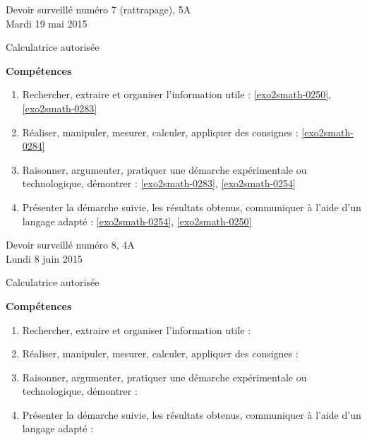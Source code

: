 \documentclass[a4paper,10pt]{article}
\begin{document}
\begin{feuilleDS}{Devoir surveillé numéro 7 (rattrapage), 5A\\ \small Mardi 19 mai 2015}
    \begin{center}
        Calculatrice autorisée
    \end{center}
\vspace{1cm}
{\bf Compétences}
\small
\begin{enumerate}
    \item
        Rechercher, extraire et organiser l'information utile : \ref{exo2smath-0250}, \ref{exo2smath-0283}
    \item
        Réaliser, manipuler, mesurer, calculer, appliquer des consignes : \ref{exo2smath-0284}
    \item
        Raisonner, argumenter, pratiquer une démarche expérimentale ou technologique, démontrer : \ref{exo2smath-0283}, \ref{exo2smath-0254}
    \item 
        Présenter la démarche suivie, les résultats obtenus, communiquer à l'aide d’un langage adapté : \ref{exo2smath-0254}, \ref{exo2smath-0250}
\end{enumerate}
\end{feuilleDS}


\begin{feuilleDS}{Devoir surveillé numéro 8, 4A\\ \small Lundi 8 juin 2015}
    \begin{center}
        Calculatrice autorisée
    \end{center}


\vspace{1cm}
{\bf Compétences}
\small
\begin{enumerate}
    \item
        Rechercher, extraire et organiser l'information utile : 
    \item
        Réaliser, manipuler, mesurer, calculer, appliquer des consignes : 
    \item
        Raisonner, argumenter, pratiquer une démarche expérimentale ou technologique, démontrer : 
    \item 
        Présenter la démarche suivie, les résultats obtenus, communiquer à l'aide d’un langage adapté : 
\end{enumerate}
\end{feuilleDS}
\end{document}

